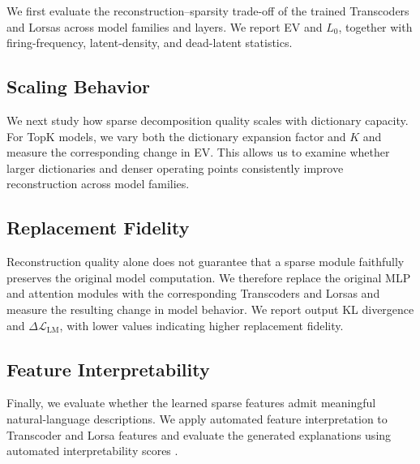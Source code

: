 \documentclass{article}
\begin{document}
We first evaluate the reconstruction--sparsity trade-off of the trained
Transcoders and Lorsas across model families and layers. We report EV and
$L_0$, together with firing-frequency, latent-density, and dead-latent
statistics.



\subsection{Scaling Behavior}

We next study how sparse decomposition quality scales with dictionary capacity.
For TopK models, we vary both the dictionary expansion factor and $K$ and
measure the corresponding change in EV. This allows us to examine whether
larger dictionaries and denser operating points consistently improve
reconstruction across model families.



\subsection{Replacement Fidelity}

Reconstruction quality alone does not guarantee that a sparse module faithfully
preserves the original model computation. We therefore replace the original
MLP and attention modules with the corresponding Transcoders and Lorsas and
measure the resulting change in model behavior. We report output KL divergence
and $\Delta\mathcal{L}_{\mathrm{LM}}$, with lower values indicating higher
replacement fidelity.



\subsection{Feature Interpretability}

Finally, we evaluate whether the learned sparse features admit meaningful
natural-language descriptions. We apply automated feature interpretation to
Transcoder and Lorsa features and evaluate the generated explanations using
automated interpretability scores
\citep{cunningham2024circuits, karvonen2025saebench}.
\end{document}
